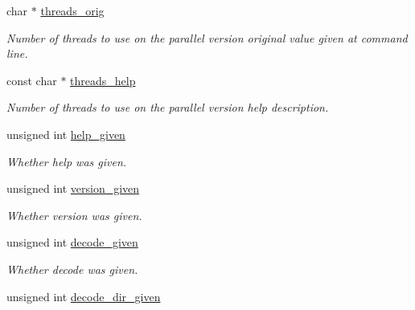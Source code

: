\begin{DoxyCompactItemize}
char $\ast$ \hyperlink{structgengetopt__args__info_af662fdbee2edf0b387c71da07331d9fe}{threads\+\_\+orig}
\begin{DoxyCompactList}\small\item\em Number of threads to use on the parallel version original value given at command line. \end{DoxyCompactList}\item 
const char $\ast$ \hyperlink{structgengetopt__args__info_a55ec6fc3721645b1c1203217fa40f32c}{threads\+\_\+help}
\begin{DoxyCompactList}\small\item\em Number of threads to use on the parallel version help description. \end{DoxyCompactList}\item 
\hypertarget{structgengetopt__args__info_ab9fd677f890731fd7d6f6c62e6dfc99c}{}unsigned int \hyperlink{structgengetopt__args__info_ab9fd677f890731fd7d6f6c62e6dfc99c}{help\+\_\+given}\label{structgengetopt__args__info_ab9fd677f890731fd7d6f6c62e6dfc99c}

\begin{DoxyCompactList}\small\item\em Whether help was given. \end{DoxyCompactList}\item 
\hypertarget{structgengetopt__args__info_ad4953a2130b2f8b94a3a687014f278e1}{}unsigned int \hyperlink{structgengetopt__args__info_ad4953a2130b2f8b94a3a687014f278e1}{version\+\_\+given}\label{structgengetopt__args__info_ad4953a2130b2f8b94a3a687014f278e1}

\begin{DoxyCompactList}\small\item\em Whether version was given. \end{DoxyCompactList}\item 
\hypertarget{structgengetopt__args__info_a81e6fb4452d3d35d3d7c7c2756da1758}{}unsigned int \hyperlink{structgengetopt__args__info_a81e6fb4452d3d35d3d7c7c2756da1758}{decode\+\_\+given}\label{structgengetopt__args__info_a81e6fb4452d3d35d3d7c7c2756da1758}

\begin{DoxyCompactList}\small\item\em Whether decode was given. \end{DoxyCompactList}\item 
\hypertarget{structgengetopt__args__info_a8115b29bf43f8b94446da4901bbb4544}{}unsigned int \hyperlink{structgengetopt__args__info_a8115b29bf43f8b94446da4901bbb4544}{decode\+\_\+dir\+\_\+given}\label{structgengetopt__args__info_a8115b29bf43f8b94446da4901bbb4544}


\end{DoxyCompactItemize}
